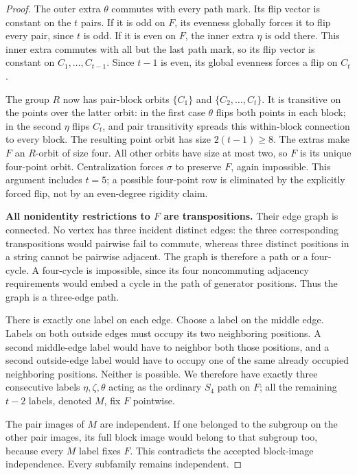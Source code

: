 \documentclass[11pt,a4paper]{article}
\begin{document}
\begin{proof}
The outer extra $\theta$ commutes with every path mark. Its flip vector
is constant on the $t$ pairs. If it is odd on $F$, its evenness globally
forces it to flip every pair, since $t$ is odd. If it is even on $F$,
the inner extra $\eta$ is odd there. This inner extra commutes with all
but the last path mark, so its flip vector is constant on
$C_1,\ldots,C_{t-1}$. Since $t-1$ is even, its global evenness forces
a flip on $C_t$.

The group $R$ now has pair-block orbits $\{C_1\}$ and
$\{C_2,\ldots,C_t\}$. It is transitive on the points over the latter
orbit: in the first case $\theta$ flips both points in each block;
in the second $\eta$ flips $C_t$, and pair transitivity spreads this
within-block connection to every block. The resulting point orbit has
size $2(t-1)\geq8$. The extras make $F$ an $R$-orbit of size four.
All other orbits have size at most two, so $F$ is its unique four-point
orbit. Centralization forces $\sigma$ to preserve $F$, again impossible.
This argument includes $t=5$; a possible four-point row is eliminated
by the explicitly forced flip, not by an even-degree rigidity claim.

\medskip\noindent\textbf{All nonidentity restrictions to $F$ are transpositions.}
Their edge graph is connected. No vertex has three incident distinct
edges: the three corresponding transpositions would pairwise fail to
commute, whereas three distinct positions in a string cannot be pairwise
adjacent. The graph is therefore a path or a four-cycle. A four-cycle
is impossible, since its four noncommuting adjacency requirements would
embed a cycle in the path of generator positions. Thus the graph is a
three-edge path.

There is exactly one label on each edge. Choose a label on the middle
edge. Labels on both outside edges must occupy its two neighboring
positions. A second middle-edge label would have to neighbor both
those positions, and a second outside-edge label would have to occupy
one of the same already occupied neighboring positions. Neither is
possible. We therefore have exactly three consecutive labels
$\eta,\zeta,\theta$ acting as the ordinary $S_4$ path on $F$; all the
remaining $t-2$ labels, denoted $M$, fix $F$ pointwise.

The pair images of $M$ are independent. If one belonged to the subgroup
on the other pair images, its full block image would belong to that
subgroup too, because every $M$ label fixes $F$. This contradicts the
accepted block-image independence. Every subfamily remains independent.


\end{proof}
\end{document}
